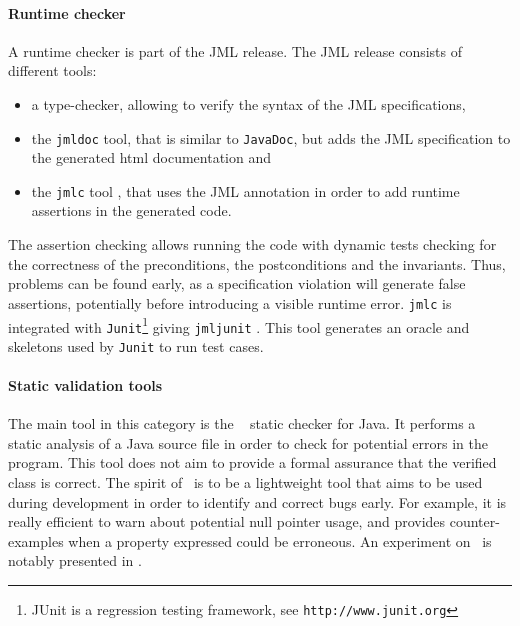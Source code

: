 \paragraph{Runtime checker} A runtime checker is part of the JML release.
 The JML release consists of different tools:
\begin{itemize}
\item a type-checker, allowing to verify the syntax of the JML
specifications,
\item the \texttt{jmldoc} tool, that is similar to \texttt{JavaDoc}, but adds the JML
specification to the generated html documentation and
\item the \texttt{jmlc} tool \cite{Cheon-Leavens02c}, that uses the JML annotation in
order to add runtime assertions in the generated code.
\end{itemize}
The assertion checking allows running the code with dynamic tests
checking for the correctness of the preconditions, the postconditions
and the invariants.  Thus, problems can be found early, as a
specification violation will generate false assertions, potentially
before introducing a visible runtime error.  \texttt{jmlc} is
integrated with
\texttt{Junit}\footnote{JUnit is a regression testing framework, see
\texttt{http://www.junit.org}} giving \texttt{jmljunit} \cite{Cheon-Leavens02}.  This
tool generates an oracle and skeletons used by \texttt{Junit} to run
test cases.

\paragraph{Static validation tools} The main tool in this category
 is the \ESC\ \cite{PLDI_02*234} static checker for Java.  It performs
 a static analysis of a Java source file in order to check for
 potential errors in the program.  This tool does not aim to provide a
 formal assurance that the verified class is correct.  The spirit of
 \ESC\ is to be a lightweight tool that aims to be used during
 development in order to identify and correct bugs early.  For
 example, it is really efficient to warn about potential null pointer
 usage, and provides counter-examples when a property expressed could
 be erroneous.  An experiment on \ESC\ is notably presented in
 \cite{Catano37:FME:2002}.

